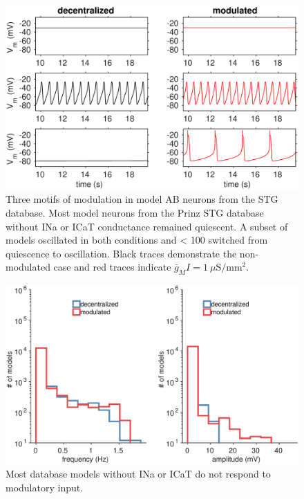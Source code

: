 \begin{figure}[h]
	\centering
	\includegraphics[width=1.0\linewidth]{gfx/prinz-models/tracePrinz}
	\caption[Three motifs of modulation in model AB neurons]{Three motifs of modulation in model \acs{AB} neurons from the \acs{STG} database.  Most model neurons from the Prinz \acs{STG} database without \acs{INa} or \acs{ICaT} conductance remained quiescent. A subset of models oscillated in both conditions and < 100 switched from quiescence to oscillation. Black traces demonstrate the non-modulated case and red traces indicate $\bar{g}_MI = 1~\mu \mathrm{S/mm^2}$.}
	\label{fig:traceprinz}
\end{figure}

\begin{figure}[h]
	\centering
	\includegraphics[width=1.0\linewidth]{gfx/prinz-models/histPrinz}
	\caption[Summary statistics of database models with modulatory input]{Most database models without \acs{INa} or \acs{ICaT} do not respond to modulatory input.}
	\label{fig:histprinz}
\end{figure}

